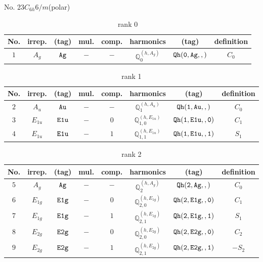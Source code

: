 \documentclass[fleqn,8pt]{jsarticle}
\begin{document}
\setcounter{MaxMatrixCols}{16}

\begin{center}
\LARGE
No. 23\quad$C_{6h}$\quad$6/m$\quad[ hexagonal ] (polar)
\end{center}
\begin{table}[ht!]
\begin{center}
\caption{rank 0}
\renewcommand{\arraystretch}{1.3}
\begin{tabular}{cccccccc} \hline \hline
No. & irrep. & (tag) & mul. & comp. & harmonics & (tag) & definition \\ \hline
$ 1 $ & $ A_{g} $ & $ {\tt Ag} $ & $ - $ & $ - $ & $ \mathbb{Q}_{0}^{(h,A_{g})} $ & $ {\tt Qh(0,Ag,,)} $ & $ C_{0} $ \\
 \hline \hline
\end{tabular}
\end{center}
\end{table}
\begin{table}[ht!]
\begin{center}
\caption{rank 1}
\renewcommand{\arraystretch}{1.3}
\begin{tabular}{cccccccc} \hline \hline
No. & irrep. & (tag) & mul. & comp. & harmonics & (tag) & definition \\ \hline
$ 2 $ & $ A_{u} $ & $ {\tt Au} $ & $ - $ & $ - $ & $ \mathbb{Q}_{1}^{(h,A_{u})} $ & $ {\tt Qh(1,Au,,)} $ & $ C_{0} $ \\
$ 3 $ & $ E_{1u} $ & $ {\tt E1u} $ & $ - $ & $ 0 $ & $ \mathbb{Q}_{1,0}^{(h,E_{1u})} $ & $ {\tt Qh(1,E1u,,0)} $ & $ C_{1} $ \\
$ 4 $ & $ E_{1u} $ & $ {\tt E1u} $ & $ - $ & $ 1 $ & $ \mathbb{Q}_{1,1}^{(h,E_{1u})} $ & $ {\tt Qh(1,E1u,,1)} $ & $ S_{1} $ \\
 \hline \hline
\end{tabular}
\end{center}
\end{table}
\begin{table}[ht!]
\begin{center}
\caption{rank 2}
\renewcommand{\arraystretch}{1.3}
\begin{tabular}{cccccccc} \hline \hline
No. & irrep. & (tag) & mul. & comp. & harmonics & (tag) & definition \\ \hline
$ 5 $ & $ A_{g} $ & $ {\tt Ag} $ & $ - $ & $ - $ & $ \mathbb{Q}_{2}^{(h,A_{g})} $ & $ {\tt Qh(2,Ag,,)} $ & $ C_{0} $ \\
$ 6 $ & $ E_{1g} $ & $ {\tt E1g} $ & $ - $ & $ 0 $ & $ \mathbb{Q}_{2,0}^{(h,E_{1g})} $ & $ {\tt Qh(2,E1g,,0)} $ & $ C_{1} $ \\
$ 7 $ & $ E_{1g} $ & $ {\tt E1g} $ & $ - $ & $ 1 $ & $ \mathbb{Q}_{2,1}^{(h,E_{1g})} $ & $ {\tt Qh(2,E1g,,1)} $ & $ S_{1} $ \\
$ 8 $ & $ E_{2g} $ & $ {\tt E2g} $ & $ - $ & $ 0 $ & $ \mathbb{Q}_{2,0}^{(h,E_{2g})} $ & $ {\tt Qh(2,E2g,,0)} $ & $ C_{2} $ \\
$ 9 $ & $ E_{2g} $ & $ {\tt E2g} $ & $ - $ & $ 1 $ & $ \mathbb{Q}_{2,1}^{(h,E_{2g})} $ & $ {\tt Qh(2,E2g,,1)} $ & $ - S_{2} $ \\
 \hline \hline
\end{tabular}
\end{center}
\end{table}
\end{document}
